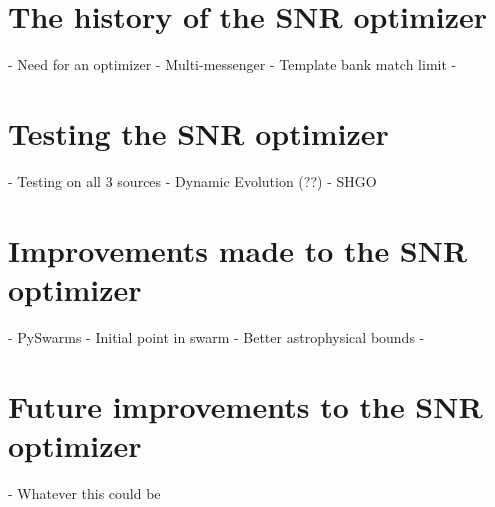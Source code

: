 
\section{\label{7:sec:optimizer-history}The history of the SNR optimizer}
- Need for an optimizer
- Multi-messenger
- Template bank match limit
- 

\section{\label{7:sec:testing}Testing the SNR optimizer}
- Testing on all 3 sources
- Dynamic Evolution (??)
- SHGO

\section{\label{7:sec:improvements}Improvements made to the SNR optimizer}
- PySwarms
- Initial point in swarm
- Better astrophysical bounds
- 

\section{\label{7:sec:future-work}Future improvements to the SNR optimizer}
- Whatever this could be
